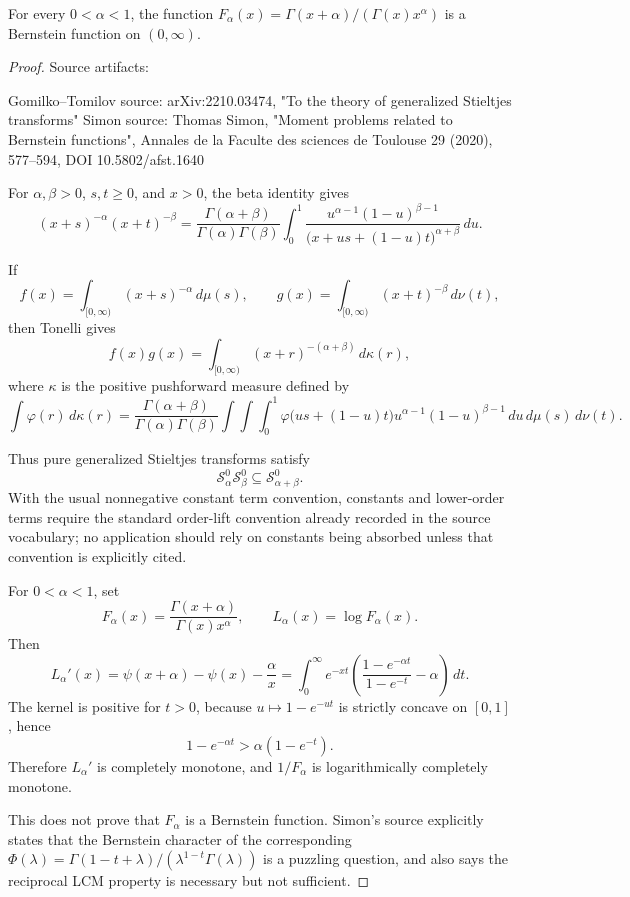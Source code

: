 \begin{proposition}
\label{res:simon-gamma-quotient-bf-alpha-window-open-problem}
For every \(0<\alpha<1\), the function \(F_\alpha(x)=\Gamma(x+\alpha)/(\Gamma(x)x^\alpha)\) is a Bernstein function on \((0,\infty)\).
\end{proposition}
\begin{proof}
Source artifacts:

Gomilko--Tomilov source: arXiv:2210.03474, "To the theory of generalized Stieltjes transforms"
Simon source: Thomas Simon, "Moment problems related to Bernstein functions", Annales de la Faculte des sciences de Toulouse 29 (2020), 577--594, DOI 10.5802/afst.1640

For \(\alpha,\beta>0\), \(s,t\ge0\), and \(x>0\), the beta identity gives
\[
(x+s)^{-\alpha}(x+t)^{-\beta}
=
\frac{\Gamma(\alpha+\beta)}{\Gamma(\alpha)\Gamma(\beta)}
\int_0^1
\frac{u^{\alpha-1}(1-u)^{\beta-1}}
{\bigl(x+us+(1-u)t\bigr)^{\alpha+\beta}}
\,du.
\]

If
\[
f(x)=\int_{[0,\infty)}(x+s)^{-\alpha}\,d\mu(s),
\qquad
g(x)=\int_{[0,\infty)}(x+t)^{-\beta}\,d\nu(t),
\]
then Tonelli gives
\[
f(x)g(x)=\int_{[0,\infty)}(x+r)^{-(\alpha+\beta)}\,d\kappa(r),
\]
where \(\kappa\) is the positive pushforward measure defined by
\[
\int \varphi(r)\,d\kappa(r)
=
\frac{\Gamma(\alpha+\beta)}{\Gamma(\alpha)\Gamma(\beta)}
\int\!\!\int\!\!\int_0^1
\varphi\bigl(us+(1-u)t\bigr)
u^{\alpha-1}(1-u)^{\beta-1}
\,du\,d\mu(s)\,d\nu(t).
\]

Thus pure generalized Stieltjes transforms satisfy
\[
\mathcal S_\alpha^{0}\mathcal S_\beta^{0}\subseteq \mathcal S_{\alpha+\beta}^{0}.
\]
With the usual nonnegative constant term convention, constants and lower-order terms require the standard order-lift convention already recorded in the source vocabulary; no application should rely on constants being absorbed unless that convention is explicitly cited.

For \(0<\alpha<1\), set
\[
F_\alpha(x)=\frac{\Gamma(x+\alpha)}{\Gamma(x)x^\alpha},
\qquad
L_\alpha(x)=\log F_\alpha(x).
\]
Then
\[
L_\alpha'(x)
=
\psi(x+\alpha)-\psi(x)-\frac{\alpha}{x}
=
\int_0^\infty e^{-xt}
\left(
\frac{1-e^{-\alpha t}}{1-e^{-t}}-\alpha
\right)\,dt.
\]
The kernel is positive for \(t>0\), because \(u\mapsto 1-e^{-ut}\) is strictly concave on \([0,1]\), hence
\[
1-e^{-\alpha t}>\alpha(1-e^{-t}).
\]
Therefore \(L_\alpha'\) is completely monotone, and \(1/F_\alpha\) is logarithmically completely monotone.

This does not prove that \(F_\alpha\) is a Bernstein function. Simon's source explicitly states that the Bernstein character of the corresponding \(\Phi(\lambda)=\Gamma(1-t+\lambda)/(\lambda^{1-t}\Gamma(\lambda))\) is a puzzling question, and also says the reciprocal LCM property is necessary but not sufficient.
\end{proof}

